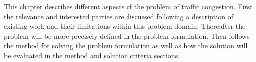 This chapter describes different aspects of the problem of traffic congestion. First the relevance and interested parties are discussed following a description of existing work and their limitations within this problem domain. Thereafter the problem will be more precisely defined in the problem formulation. Then follows the method for solving the problem formulation as well as how the solution will be evaluated in the method and solution criteria sections. 